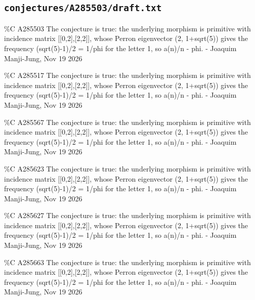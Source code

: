 \subsection*{\texttt{conjectures/A285503/draft.txt}}
{\small\raggedright\ttfamily
\%C A285503 The conjecture is true: the underlying morphism is primitive with incidence matrix [[0,2],[2,2]], whose Perron eigenvector (2, 1+sqrt(5)) gives the frequency (sqrt(5)-1)/2 = 1/phi for the letter 1, so a(n)/n - phi. - Joaquim Manji-Jung, Nov 19 2026\par
\%C A285517 The conjecture is true: the underlying morphism is primitive with incidence matrix [[0,2],[2,2]], whose Perron eigenvector (2, 1+sqrt(5)) gives the frequency (sqrt(5)-1)/2 = 1/phi for the letter 1, so a(n)/n - phi. - Joaquim Manji-Jung, Nov 19 2026\par
\%C A285567 The conjecture is true: the underlying morphism is primitive with incidence matrix [[0,2],[2,2]], whose Perron eigenvector (2, 1+sqrt(5)) gives the frequency (sqrt(5)-1)/2 = 1/phi for the letter 1, so a(n)/n - phi. - Joaquim Manji-Jung, Nov 19 2026\par
\%C A285623 The conjecture is true: the underlying morphism is primitive with incidence matrix [[0,2],[2,2]], whose Perron eigenvector (2, 1+sqrt(5)) gives the frequency (sqrt(5)-1)/2 = 1/phi for the letter 1, so a(n)/n - phi. - Joaquim Manji-Jung, Nov 19 2026\par
\%C A285627 The conjecture is true: the underlying morphism is primitive with incidence matrix [[0,2],[2,2]], whose Perron eigenvector (2, 1+sqrt(5)) gives the frequency (sqrt(5)-1)/2 = 1/phi for the letter 1, so a(n)/n - phi. - Joaquim Manji-Jung, Nov 19 2026\par
\%C A285663 The conjecture is true: the underlying morphism is primitive with incidence matrix [[0,2],[2,2]], whose Perron eigenvector (2, 1+sqrt(5)) gives the frequency (sqrt(5)-1)/2 = 1/phi for the letter 1, so a(n)/n - phi. - Joaquim Manji-Jung, Nov 19 2026\par
}
